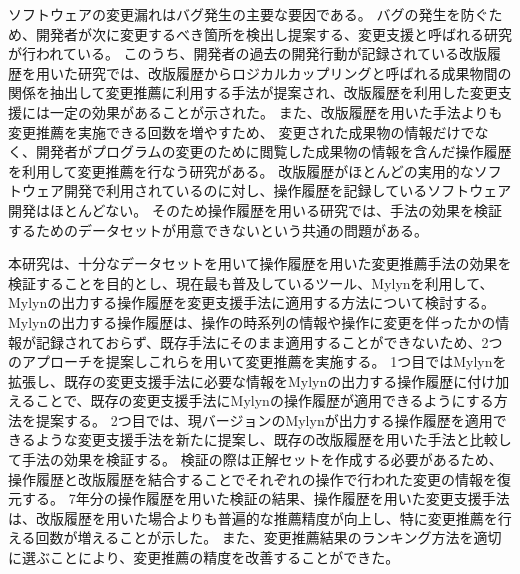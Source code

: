 ソフトウェアの変更漏れはバグ発生の主要な要因である。
バグの発生を防ぐため、開発者が次に変更するべき箇所を検出し提案する、変更支援と呼ばれる研究が行われている。
このうち、開発者の過去の開発行動が記録されている改版履歴を用いた研究では、改版履歴からロジカルカップリングと呼ばれる成果物間の関係を抽出して変更推薦に利用する手法が提案され、改版履歴を利用した変更支援には一定の効果があることが示された。
また、改版履歴を用いた手法よりも変更推薦を実施できる回数を増やすため、
変更された成果物の情報だけでなく、開発者がプログラムの変更のために閲覧した成果物の情報を含んだ操作履歴を利用して変更推薦を行なう研究がある。
改版履歴がほとんどの実用的なソフトウェア開発で利用されているのに対し、操作履歴を記録しているソフトウェア開発はほとんどない。
そのため操作履歴を用いる研究では、手法の効果を検証するためのデータセットが用意できないという共通の問題がある。

本研究は、十分なデータセットを用いて操作履歴を用いた変更推薦手法の効果を検証することを目的とし、現在最も普及しているツール、Mylynを利用して、Mylynの出力する操作履歴を変更支援手法に適用する方法について検討する。
Mylynの出力する操作履歴は、操作の時系列の情報や操作に変更を伴ったかの情報が記録されておらず、既存手法にそのまま適用することができないため、2つのアプローチを提案しこれらを用いて変更推薦を実施する。
1つ目ではMylynを拡張し、既存の変更支援手法に必要な情報をMylynの出力する操作履歴に付け加えることで、既存の変更支援手法にMylynの操作履歴が適用できるようにする方法を提案する。
2つ目では、現バージョンのMylynが出力する操作履歴を適用できるような変更支援手法を新たに提案し、既存の改版履歴を用いた手法と比較して手法の効果を検証する。
検証の際は正解セットを作成する必要があるため、操作履歴と改版履歴を結合することでそれぞれの操作で行われた変更の情報を復元する。
7年分の操作履歴を用いた検証の結果、操作履歴を用いた変更支援手法は、改版履歴を用いた場合よりも普遍的な推薦精度が向上し、特に変更推薦を行える回数が増えることが示した。
また、変更推薦結果のランキング方法を適切に選ぶことにより、変更推薦の精度を改善することができた。

